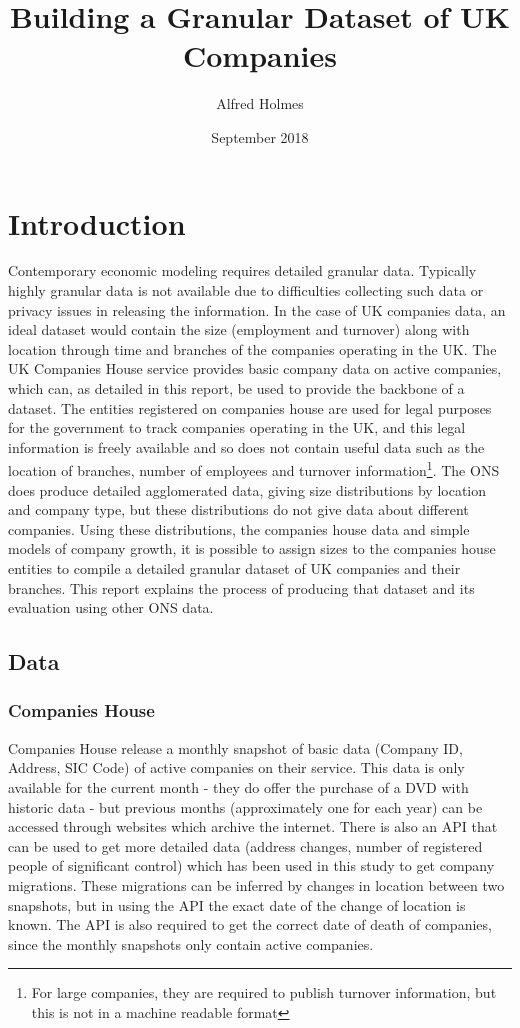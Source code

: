 \documentclass[a4paper,10pt]{article}
\title{Building a Granular Dataset of UK Companies}
\author{Alfred Holmes}
\date{September 2018}
\begin{document}
\maketitle
\section{Introduction}
Contemporary economic modeling requires detailed granular data. Typically highly granular data is not available due to difficulties collecting such data or privacy issues in releasing the information. In the case of UK companies data, an ideal dataset would contain the size (employment and turnover) along with location through time and branches of the companies operating in the UK. The UK Companies House service provides basic company data on active companies, which can, as detailed in this report, be used to provide the backbone of a dataset. The entities registered on companies house are used for legal purposes for the government to track companies operating in the UK, and this legal information is freely available and so does not contain useful data such as the location of branches, number of employees and turnover information\footnote{For large companies, they are required to publish turnover information, but this is not in a machine readable format}. The ONS does produce detailed agglomerated data, giving size distributions by location and company type, but these distributions do not give data about different companies. Using these distributions, the companies house data and simple models of company growth, it is possible to assign sizes to the companies house entities to compile a detailed granular dataset of UK companies and their branches. This report explains the process of producing that dataset and its evaluation using other ONS data.  

\subsection{Data}
\subsubsection{Companies House}
Companies House release a monthly snapshot of basic data (Company ID, Address, SIC Code) of active companies on their service. This data is only available for the current month - they do offer the purchase of a DVD with historic data - but previous months (approximately one for each year) can be accessed through websites which archive the internet. There is also an API that can be used to get more detailed data (address changes, number of registered people of significant control) which has been used in this study to get company migrations. These migrations can be inferred by changes in location between two snapshots, but in using the API the exact date of the change of location is known. The API is also required to get the correct date of death of companies, since the monthly snapshots only contain active companies.
\end{document}

